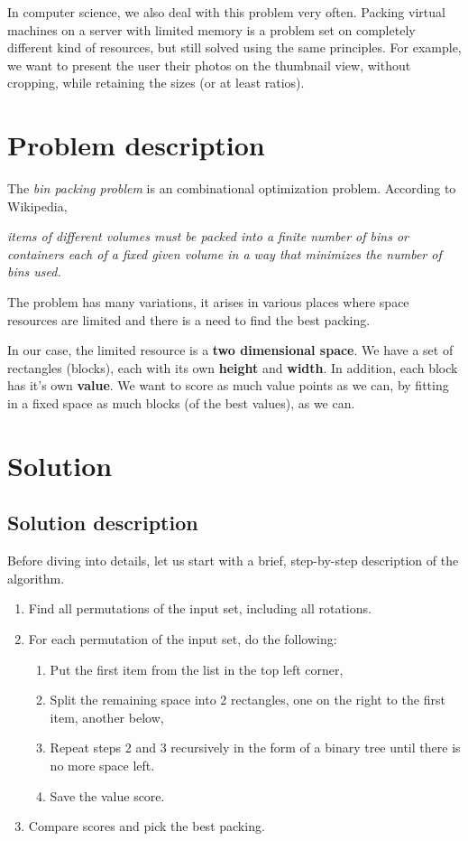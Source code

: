 In computer science, we also deal with this problem very often.
Packing virtual machines on a server with limited memory is a problem set
on completely different kind of resources,
but still solved using the same principles.
For example, we want to present the user their photos on the thumbnail view,
without cropping, while retaining the sizes (or at least ratios).

\section{Problem description}
The \textit{bin packing problem} is an combinational optimization problem.
According to Wikipedia\cite{wikibinpacking},
\begin{displayquote}
\textelp{} \textit{items of different volumes must be packed into a finite number of
bins or containers each of a fixed given volume in a way that minimizes the
number of bins used.}
\end{displayquote}
The problem has many variations,
it arises in various places where space resources are limited and there is a
need to find the best packing.

In our case, the limited resource is a \textbf{two dimensional space}.
We have a set of rectangles (blocks),
each with its own \textbf{height} and \textbf{width}.
In addition, each block has it's own \textbf{value}.
We want to score as much value points as we can,
by fitting in a fixed space as much blocks (of the best values),
as we can.

\newpage
\section{Solution}
\subsection{Solution description}
Before diving into details, let us start with a brief,
step-by-step description of the algorithm.

\begin{enumerate}
  \item Find all permutations of the input set,
    including all rotations.
  \item For each permutation of the input set, do the following:
  \begin{enumerate}
    \item Put the first item from the list in the top left corner,
    \item Split the remaining space into 2 rectangles, one on the right
      to the first item, another below,
    \item Repeat steps 2 and 3 recursively in the form of a binary tree
      until there is no more space left.
    \item Save the value score.
  \end{enumerate}
  \item Compare scores and pick the best packing. 
\end{enumerate}

